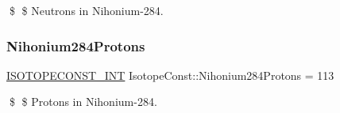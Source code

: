 \$ \$ Neutrons in Nihonium-\/284. \mbox{\label{group___isotope_const-_nihonium-_nh284_ga48bcee0066870f64ebef200f40355a11}} 
\subsubsection{\texorpdfstring{Nihonium284\+Protons}{Nihonium284Protons}}
{\footnotesize\ttfamily \mbox{\hyperlink{group___isotope_const-_macros_ga5f18360b3e99483a35c32d789e62621c}{I\+S\+O\+T\+O\+P\+E\+C\+O\+N\+S\+T\+\_\+\+I\+NT}} Isotope\+Const\+::\+Nihonium284\+Protons = 113}

\$ \$ Protons in Nihonium-\/284. 